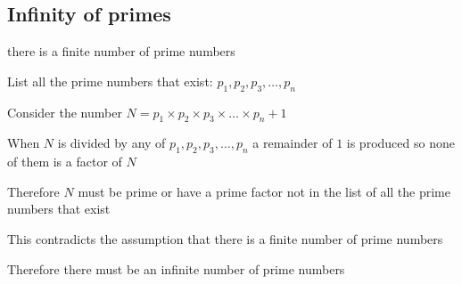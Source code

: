 \subsection{Infinity of primes}
\begin{description}
    \item [Assumption:] there is a finite number of prime numbers
    \item List all the prime numbers that exist: $p_1, p_2, p_3, \dots, p_n$
    \item Consider the number $N = p_1 \times p_2 \times p_3 \times \dots \times p_n + 1$
    \item When $N$ is divided by any of $p_1, p_2, p_3, \dots, p_n$ a remainder of $1$ is produced so none of them is a factor of $N$
    \item Therefore $N$ must be prime or have a prime factor not in the list of all the prime numbers that exist
    \item This contradicts the assumption that there is a finite number of prime numbers
    \item Therefore there must be an infinite number of prime numbers
\end{description}
